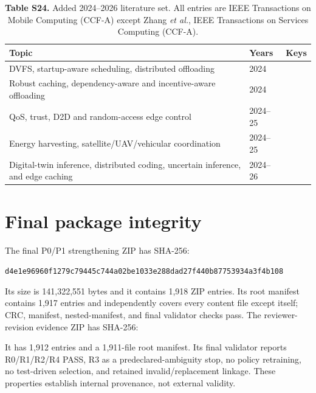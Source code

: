 \documentclass[10pt,a4paper]{article}
\begin{document}
\begin{table}[h!]
\centering\scriptsize
\caption*{\textbf{Table S24.} Added 2024--2026 literature set. All entries are IEEE Transactions on Mobile Computing (CCF-A) except Zhang \emph{et al.}, IEEE Transactions on Services Computing (CCF-A).}
\begin{tabular}{p{}ll}
\toprule
Topic & Years & Keys\\\midrule
DVFS, startup-aware scheduling, distributed offloading & 2024 & \cite{Zhang2024DVFO,Lou2024Startup,Kim2024DistributedOffload}\\
Robust caching, dependency-aware and incentive-aware offloading & 2024 & \cite{Chen2024ABR,Feng2024PRAISE,Tutuncuoglu2024Serverless,Hu2024MICDA}\\
QoS, trust, D2D and random-access edge control & 2024--25 & \cite{Maleki2024QCS,Wang2025TrustOffload,Hu2025SITOff,Han2025OffloadingGame}\\
Energy harvesting, satellite/UAV/vehicular coordination & 2024--25 & \cite{Zhang2024Satellite,Luo2025SolarEdge,Gong2025UAV3D,Zhao2025COHCTO}\\
Digital-twin inference, distributed coding, uncertain inference, and edge caching & 2024--26 & \cite{Zhang2024AoI,Qiu2026Barycentric,Nan2026RobustDNN,Luo2025EdgeCache,Li2024FIMI}\\
\bottomrule
\end{tabular}
\end{table}

\section{Final package integrity}
The final P0/P1 strengthening ZIP has SHA-256:
\begin{center}\small\texttt{d4e1e96960f1279c79445c744a02be1033e288dad27f440b87753934a3f4b108}\end{center}
Its size is 141,322,551 bytes and it contains 1,918 ZIP entries. Its root manifest contains 1,917 entries and independently covers every content file except itself; CRC, manifest, nested-manifest, and final validator checks pass. The reviewer-revision evidence ZIP has SHA-256:
\begin{center}\small{}\end{center}
It has 1,912 entries and a 1,911-file root manifest. Its final validator reports R0/R1/R2/R4 PASS, R3 as a predeclared-ambiguity stop, no policy retraining, no test-driven selection, and retained invalid/replacement linkage. These properties establish internal provenance, not external validity.
\clearpage


\end{document}
